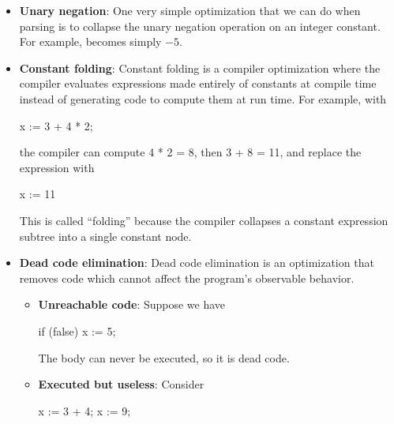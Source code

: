 \documentclass{report}
\begin{document}
        \pagebreak 
        \begin{itemize}
            \item \textbf{Unary negation}: One very simple optimization that we can do when parsing is to collapse the unary negation operation on an integer constant. For example, 
                \bigbreak \noindent 
                \bigbreak \noindent 
                becomes simply $-5$.
            \item \textbf{Constant folding}: Constant folding is a compiler optimization where the compiler evaluates expressions made entirely of constants at compile time instead of generating code to compute them at run time. For example, with
                \bigbreak \noindent 
                \begin{cppcode}
                x := 3 + 4 * 2;
                \end{cppcode}
                \bigbreak \noindent 
                the compiler can compute 4 * 2 = 8, then 3 + 8 = 11, and replace the expression with
                \bigbreak \noindent 
                \begin{cppcode}
                x := 11
                \end{cppcode}
                \bigbreak \noindent 
                This is called “folding” because the compiler collapses a constant expression subtree into a single constant node.
            \item \textbf{Dead code elimination}: Dead code elimination is an optimization that removes code which cannot affect the program’s observable behavior.
                \begin{itemize}
                    \item \textbf{Unreachable code}: Suppose we have
                        \bigbreak \noindent 
                        \begin{cppcode}
                            if (false) {
                                x := 5;
                            }
                        \end{cppcode}
                        \bigbreak \noindent 
                        The body can never be executed, so it is dead code.
                    \item \textbf{Executed but useless}: Consider
                        \bigbreak \noindent 
                        \begin{cppcode}
                            x := 3 + 4;
                            x := 9;

\end{cppcode}
\end{itemize}
\end{itemize}
\end{document}
